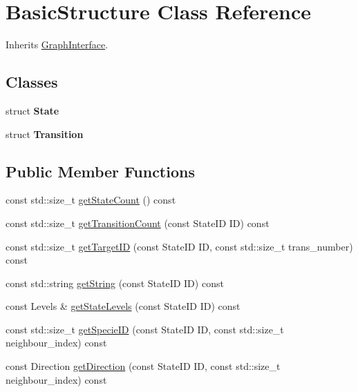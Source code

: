 \hypertarget{class_basic_structure}{\section{Basic\-Structure Class Reference}
\label{class_basic_structure}
}


Inherits \hyperlink{class_graph_interface}{Graph\-Interface}.

\subsection*{Classes}
\begin{DoxyCompactItemize}
\item 
struct {\bfseries State}
\item 
struct {\bfseries Transition}
\end{DoxyCompactItemize}
\subsection*{Public Member Functions}
\begin{DoxyCompactItemize}
\item 
const std\-::size\-\_\-t \hyperlink{class_basic_structure_ac1db5f95d7bd7549bce1cad8be6ebabd}{get\-State\-Count} () const 
\item 
const std\-::size\-\_\-t \hyperlink{class_basic_structure_a556f1075b553d33b4a6bfb542209682b}{get\-Transition\-Count} (const State\-I\-D I\-D) const 
\item 
const std\-::size\-\_\-t \hyperlink{class_basic_structure_aeca3b25a5be8a4d27f6090485b132dc4}{get\-Target\-I\-D} (const State\-I\-D I\-D, const std\-::size\-\_\-t trans\-\_\-number) const 
\item 
const std\-::string \hyperlink{class_basic_structure_a8d416ca7a8aa76a8124b1a077ef67eab}{get\-String} (const State\-I\-D I\-D) const 
\item 
const Levels \& \hyperlink{class_basic_structure_a16e4995e8983e3882015158ef3141dba}{get\-State\-Levels} (const State\-I\-D I\-D) const 
\item 
const std\-::size\-\_\-t \hyperlink{class_basic_structure_af3766288b7b8d68ab62e650fc261d8de}{get\-Specie\-I\-D} (const State\-I\-D I\-D, const std\-::size\-\_\-t neighbour\-\_\-index) const 
\item 
const Direction \hyperlink{class_basic_structure_afff4c3bdb6c95f1bfe8a12a00df3875f}{get\-Direction} (const State\-I\-D I\-D, const std\-::size\-\_\-t neighbour\-\_\-index) const 
\end{DoxyCompactItemize}
